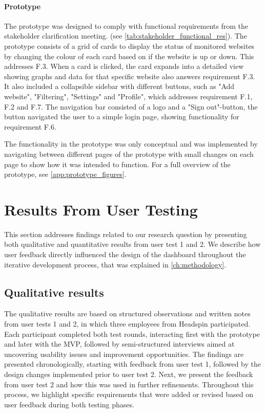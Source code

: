 \paragraph{Prototype}
The prototype was designed to comply with functional requirements from the stakeholder clarification meeting. (see \autoref{tab:stakeholder_functional_res}). The prototype consists of a grid of cards to display the status of monitored websites by changing the colour of each card based on if the website is up or down. This addresses F.3. When a card is clicked, the card expands into a detailed view showing graphs and data for that specific website also answers requirement F.3. It also included a collapsible sidebar with different buttons, such as "Add website", "Filtering", "Settings" and "Profile", which addresses requirement F.1, F.2 and F.7. The navigation bar consisted of a logo and a "Sign out"-button, the button navigated the user to a simple login page, showing functionality for requirement F.6. 

The functionality in the prototype was only conceptual and was implemented by navigating between different pages of the prototype with small changes on each page to show how it was intended to function. For a full overview of the prototype, see \autoref{app:prototype_figures}.


\section{Results From User Testing}
\label{sec:user_test_results}
This section addresses findings related to our research question by presenting both qualitative and quantitative results from user test 1 and 2. We describe how user feedback directly influenced the design of the dashboard throughout the iterative development process, that was explained in \autoref{ch:methodology}.

\subsection{Qualitative results}
The qualitative results are based on structured observations and written notes from user tests 1 and 2, in which three employees from Headspin participated. Each participant completed both test rounds, interacting first with the prototype and later with the MVP, followed by semi-structured interviews aimed at uncovering usability issues and improvement opportunities. The findings are presented chronologically, starting with feedback from user test 1, followed by the design changes implemented prior to user test 2. Next, we present the feedback from user test 2 and how this was used in further refinements. Throughout this process, we highlight specific requirements that were added or revised based on user feedback during both testing phases.


